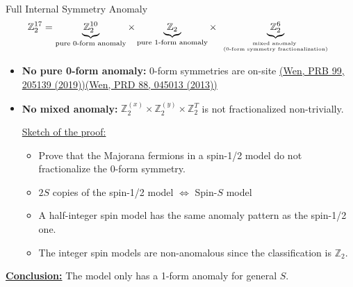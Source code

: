 \documentclass[professionalfont]{beamer}
\newcommand{\hereref}[2]{\href{#1}{{\tiny (#2)}}}
\begin{document}
\begin{frame}{Full Internal Symmetry Anomaly}
    \[
    \mathbb{Z}_2^{17} = \underbrace{\mathbb{Z}_2^{10}}_{\text{pure 0-form anomaly}} \times \underbrace{\mathbb{Z}_2}_{\text{pure 1-form anomaly}} \times \underbrace{\mathbb{Z}_2^{6}}_{\tiny
    \begin{array}{c}
        \text{mixed anomaly } \\
        \text{(0-form symmetry fractionalization)}
    \end{array}
    }
    \]
    \begin{itemize}
        \item \textbf{No pure 0-form anomaly:} 0-form symmetries are on-site \hereref{https://doi.org/10.1103/PhysRevB.99.205139}{Wen, PRB 99, 205139 (2019)}\hereref{https://doi.org/10.1103/PhysRevD.88.045013}{Wen, PRD 88, 045013 (2013)}
        \item \textbf{No mixed anomaly:} $\mathbb{Z}_2^{(x)}\times \mathbb{Z}_2^{(y)}\times \mathbb{Z}_2^T$ is not fractionalized non-trivially.

        \underline{Sketch of the proof:} 
        \begin{itemize}
            \item Prove that the Majorana fermions in a spin-1/2 model do not fractionalize the 0-form symmetry.
            \item $2S$ copies of the spin-1/2 model $\Leftrightarrow$ Spin-$S$ model
            \item A half-integer spin model has the same anomaly pattern as the spin-1/2 one.
            
            \item The integer spin models are non-anomalous since the classification is $\mathbb{Z}_2$.
        \end{itemize}
    \end{itemize}
\textbf{\underline{Conclusion:}} The model only has a 1-form anomaly for general $S$.
\end{frame}
\end{document}
